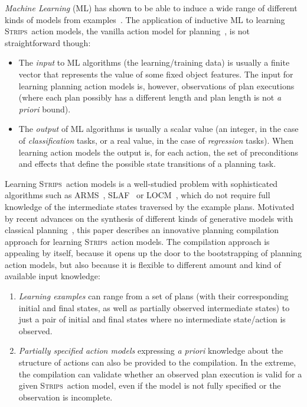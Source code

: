 \documentclass[runningheads]{llncs}
\newcommand{\strips}{\textsc{Strips}}     %
\begin{document}
{\em Machine Learning} (ML) has shown to be able to induce a wide range of different kinds of models from examples~\cite{michalski2013machine}. The application of inductive ML to learning \strips\ action models, the vanilla action model for planning~\cite{fikes1971strips}, is not straightforward though:
\begin{itemize}
\item The {\em input} to ML algorithms (the learning/training data) is usually a finite vector that represents the value of some fixed object features. The input for learning planning action models is, however, observations of plan executions (where each plan possibly has a different length and plan length is not {\em a priori} bound).
\item The {\em output} of ML algorithms is usually a scalar value (an integer, in the case of {\em classification} tasks, or a real value, in the case of {\em regression} tasks). When learning action models the output is, for each action, the set of preconditions and effects that define the possible state transitions of a planning task.
\end{itemize}

Learning \strips\ action models is a well-studied problem with sophisticated algorithms such as {\sc ARMS}~\cite{yang2007learning}, {\sc SLAF}~\cite{amir:alearning:JAIR08} or {\sc LOCM}~\cite{cresswell2013acquiring}, which do not require full knowledge of the intermediate states traversed by the example plans. Motivated by recent advances on the synthesis of different kinds of generative models with classical planning~\cite{bonet2009automatic,segovia2017generating,segovia2018computing,segovia2019computing}, this paper describes an innovative planning compilation approach for learning \strips\ action models. The compilation approach is appealing by itself, because it opens up the door to the bootstrapping of planning action models, but also because it is flexible to different amount and kind of available input knowledge:
\begin{enumerate}
\item {\em Learning examples} can range from a set of plans (with their corresponding initial and final states, as well as partially observed intermediate states) to just a pair of initial and final states where no intermediate state/action is observed.
\item {\em Partially specified action models} expressing {\em a priori} knowledge about the structure of actions can also be provided to the compilation. In the extreme, the compilation can validate whether an observed plan execution is valid for a given \strips\ action model, even if the model is not fully specified or the observation is incomplete.
\end{enumerate}
\end{document}
